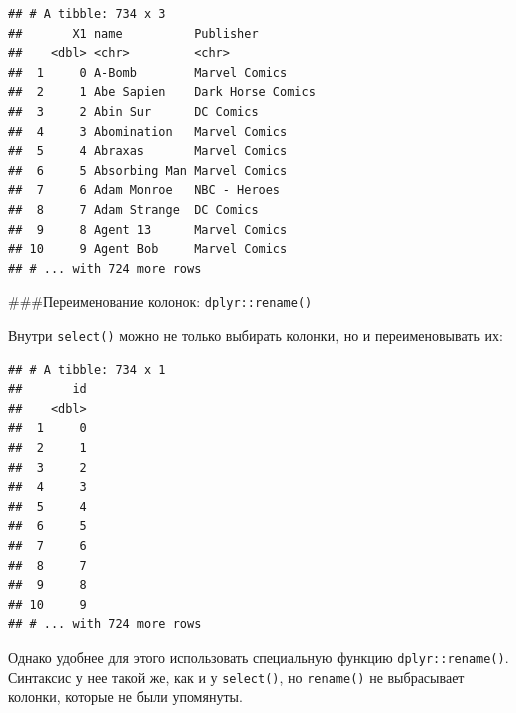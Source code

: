 \documentclass[
]{book}
\newenvironment{Shaded}{\begin{snugshade}}{\end{snugshade}}
\newcommand{\DataTypeTok}[1]{\textcolor[rgb]{0.13,0.29,0.53}{#1}}
\newcommand{\KeywordTok}[1]{\textcolor[rgb]{0.13,0.29,0.53}{\textbf{#1}}}
\newcommand{\NormalTok}[1]{#1}
\newcommand{\OperatorTok}[1]{\textcolor[rgb]{0.81,0.36,0.00}{\textbf{#1}}}
\newcommand{\StringTok}[1]{\textcolor[rgb]{0.31,0.60,0.02}{#1}}
\begin{document}
\begin{verbatim}
## # A tibble: 734 x 3
##       X1 name          Publisher        
##    <dbl> <chr>         <chr>            
##  1     0 A-Bomb        Marvel Comics    
##  2     1 Abe Sapien    Dark Horse Comics
##  3     2 Abin Sur      DC Comics        
##  4     3 Abomination   Marvel Comics    
##  5     4 Abraxas       Marvel Comics    
##  6     5 Absorbing Man Marvel Comics    
##  7     6 Adam Monroe   NBC - Heroes     
##  8     7 Adam Strange  DC Comics        
##  9     8 Agent 13      Marvel Comics    
## 10     9 Agent Bob     Marvel Comics    
## # ... with 724 more rows
\end{verbatim}

\#\#\#Переименование колонок: \texttt{dplyr::rename()}

Внутри \texttt{select()} можно не только выбирать колонки, но и переименовывать их:

\begin{Shaded}
\end{Shaded}

\begin{verbatim}
## # A tibble: 734 x 1
##       id
##    <dbl>
##  1     0
##  2     1
##  3     2
##  4     3
##  5     4
##  6     5
##  7     6
##  8     7
##  9     8
## 10     9
## # ... with 724 more rows
\end{verbatim}

Однако удобнее для этого использовать специальную функцию \texttt{dplyr::rename()}. Синтаксис у нее такой же, как и у \texttt{select()}, но \texttt{rename()} не выбрасывает колонки, которые не были упомянуты.

\begin{Shaded}
\end{Shaded}
\end{document}
